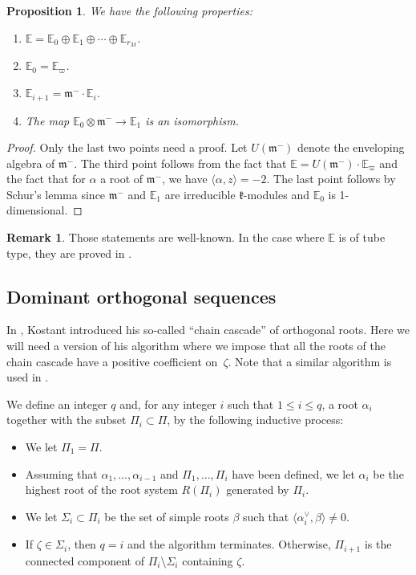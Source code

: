 \documentclass[JEP,XML,SOM,Unicode,NoFloatCountersInSection]{cedram}
\newenvironment{enumeratea}
{\bgroup\def\theenumi{\alph{enumi}}\begin{enumerate}}
{\end{enumerate}\egroup}
\let\oldvee\vee
\renewcommand{\vee}{{\scriptscriptstyle\oldvee}}
\newcommand{\citestar}[3]{\cite[#3]{#1}}
\theoremstyle{plain}
\newtheorem{prop}[theo]{Proposition}
\theoremstyle{definition}
\newtheorem{rema}[theo]{Remark}
\newcommand{\bE}{\mathbb{E}}
\newcommand{\fk}{\mathfrak{k}}
\newcommand{\fm}{\mathfrak{m}}
\newcommand{\rkm}{{r_M}}
\newcommand{\scal}[1]{\langle #1 \rangle}
\begin{document}
\begin{prop}
\label{prop:Ei}
We have the following properties:
\begin{enumeratea}
\item\label{prop:Eia} $\bE = \bE_0 \oplus \bE_{1} \oplus \cdots \oplus \bE_{\rkm}$.
\item\label{prop:Eib} $\bE_0 = \bE_{\varpi}$.
\item\label{prop:Eic} $\bE_{i+1} = \fm^- \cdot \bE_i$.
\item\label{prop:Eid} The map $\bE_0 \otimes \fm^- \to \bE_1$ is an isomorphism.
\end{enumeratea}
\end{prop}
\begin{proof}
Only the last two points need a proof. Let $U(\fm^-)$ denote the enveloping algebra of $\fm^-$. The
third point
follows from the fact that $\bE = U(\fm^-) \cdot \bE_{\varpi}$ and the fact that for $\alpha$ a root of $\fm^-$,
we have $\scal{\alpha,z} = -2 $.
The last point follows by Schur's lemma since $\fm^-$ and $\bE_1$ are irreducible $\fk$-modules and
$\bE_0$ is 1-dimensional.
\end{proof}

\begin{rema}
Those statements are well-known. In the case where $\bE$ is of tube type, they are proved in \citestar{Gross}*{Prop.\,5.2}.
\end{rema}

\subsection{Dominant orthogonal sequences}
\label{subsec:DOS}

In \cite{kostant}, Kostant introduced his so-called ``chain cascade'' of orthogonal roots.
Here we will need a version of his algorithm where we impose that all the roots of the chain cascade
have a positive coefficient on~$\zeta$. Note that a similar algorithm is used in \cite{buch}.

We define an integer $q$ and, for any integer $i$
such that $1 \leq i \leq q$,
a root $\alpha_i$ together with the subset $\Pi_i \subset \Pi$, by the following inductive process:
\begin{itemize}
\item We let $\Pi_1=\Pi$.
\item Assuming that $\alpha_1,\ldots,\alpha_{i-1}$ and $\Pi_1,\ldots,\Pi_i$ have been defined,
we let $\alpha_i$ be the highest root of the root system $R(\Pi_i)$ generated by $\Pi_i$.
\item We let $\Sigma_i \subset \Pi_i$ be the set of simple roots $\beta$ such that
$\scal{\alpha_i^\vee,\beta} \neq 0$.
\item If $\zeta \in \Sigma_i$, then $q=i$ and the algorithm terminates. Otherwise, $\Pi_{i+1}$
is the connected component of $\Pi_i \setminus \Sigma_i$ containing $\zeta$.
\end{itemize}
\end{document}
